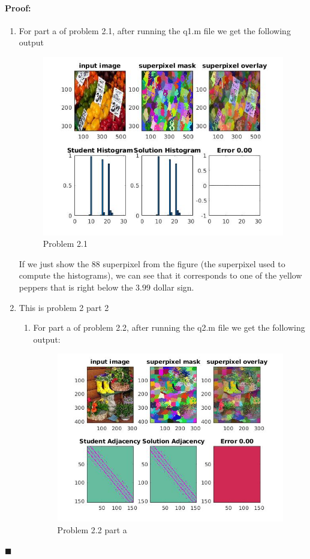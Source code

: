 \documentclass[12pt]{article}
\newenvironment{proof}{\paragraph{Proof: }}{\hfill$\blacksquare$}
\begin{document}
\begin{proof}
\begin{enumerate}
\item For part a of problem 2.1, after running the q1.m file we get the following output

\begin{figure}[!htbp]
\centering
\includegraphics[width=18cm]{problem2_1.jpg}
\caption{Problem 2.1}
\end{figure}

If we just show the 88 superpixel from the figure (the superpixel used to compute the histograms), we can see that it corresponds to one of the yellow peppers that is right below the $3.99$ dollar sign.

\item  This is problem 2 part 2

\begin{enumerate}
\item For part a of problem 2.2, after running the q2.m file we get the following output:

\begin{figure}[!htbp]
\centering
\includegraphics[width=18cm]{problem2_2.jpg}
\caption{Problem 2.2 part a}
\end{figure}


\end{enumerate}
\end{enumerate}
\end{proof}
\end{document}
